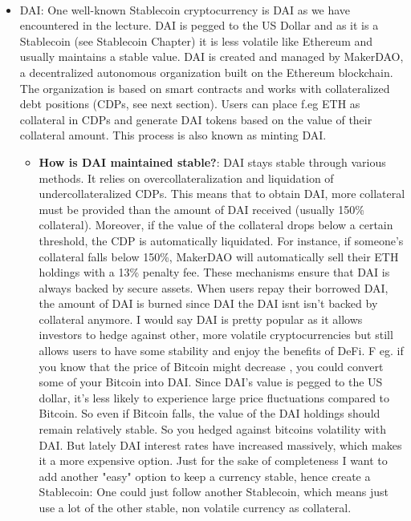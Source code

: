 \documentclass{article}
\begin{document}
\\
\begin{itemize}
\item {DAI}: One well-known Stablecoin cryptocurrency is DAI as we have encountered in the lecture. DAI is pegged to the US Dollar and as it is a Stablecoin (see Stablecoin Chapter) it is less volatile like Ethereum and usually maintains a stable value. DAI is created and managed by MakerDAO, a decentralized autonomous organization built on the Ethereum blockchain. The organization is based on smart contracts and works with collateralized debt positions (CDPs, see next section). Users can place f.eg ETH as collateral in CDPs and generate DAI tokens based on the value of their collateral amount. This process is also known as minting DAI.
\begin{itemize}
\item \textbf{How is DAI maintained stable?}: DAI stays stable through various methods. It relies on overcollateralization and liquidation of undercollateralized CDPs. This means that to obtain DAI, more collateral must be provided than the amount of DAI received (usually 150\% collateral). Moreover, if the value of the collateral drops below a certain threshold, the CDP is automatically liquidated. For instance, if someone's collateral falls below 150\%, MakerDAO will automatically sell their ETH holdings with a 13\% penalty fee. These mechanisms ensure that DAI is always backed by secure assets. When users repay their borrowed DAI, the amount of DAI is burned since DAI the DAI isnt isn't backed by collateral anymore. I would say DAI is pretty popular as it allows investors to hedge against other, more volatile cryptocurrencies but still allows users to have some stability and enjoy the benefits of DeFi. F eg. if you know that the price of Bitcoin might decrease , you could convert some of your Bitcoin into DAI. Since DAI's value is pegged to the US dollar, it's less likely to experience large price fluctuations compared to Bitcoin. So even if Bitcoin falls, the value of the DAI holdings should remain relatively stable. So you hedged against bitcoins volatility with DAI. But lately DAI interest rates have increased massively, which makes it a more expensive option.
Just for the sake of completeness I want to add another "easy" option to keep a currency stable, hence create a Stablecoin: One could just follow another Stablecoin, which means just use a lot of the other stable, non volatile currency as collateral.
\end{itemize}
\begin{itemize}

\end{itemize}
\end{itemize}
\end{document}
